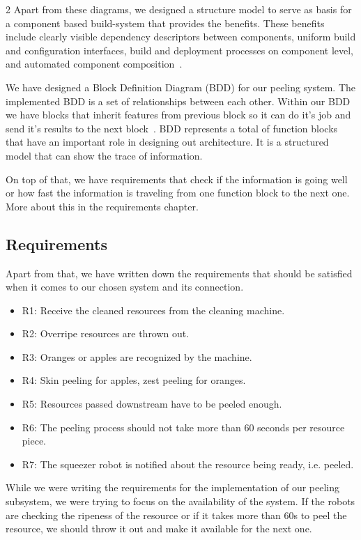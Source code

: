\documentclass{article}
\begin{document}
\begin{multicols}{2}
Apart from these diagrams, we designed a structure model to serve as basis for a component based build-system that provides the benefits. These benefits include clearly visible dependency descriptors between components, uniform build and configuration interfaces, build and deployment processes on component level, and automated component composition~\cite{b11}. 

We have designed a Block Definition Diagram (BDD) for our peeling system. The implemented BDD is a set of relationships between each other. Within our BDD we have blocks that inherit features from previous block so it can do it's job and send it's results to the next block~\cite{b4}. BDD represents a total of function blocks that have an important role in designing out architecture. It is a structured model that can show the trace of information. 

On top of that, we have requirements that check if the information is going well or how fast the information is traveling from one function block to the next one. More about this in the requirements chapter. 
\subsection{Requirements}
\color{black}
Apart from that, we have written down the requirements that should be satisfied when it comes to our chosen system and its connection.
\begin{itemize}
    \item R1: Receive the cleaned resources from the cleaning machine. 
    \item R2: Overripe resources are thrown out. 
    \item R3: Oranges or apples are recognized by the machine.
    \item R4: Skin peeling for apples, zest peeling for oranges.
    \item R5: Resources passed downstream have to be peeled enough.
    \item R6: The peeling process should not take more than 60 seconds per resource piece.
    \item R7: The squeezer robot is notified about the resource being ready, i.e. peeled.
\end{itemize}


While we were writing the requirements for the implementation of our peeling subsystem, we were trying to focus on the availability of the system. If the robots are checking the ripeness of the resource or if it takes more than 60s to peel the resource, we should throw it out and make it available for the next one. 


\end{multicols}
\end{document}
